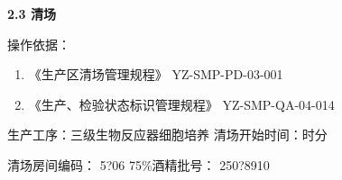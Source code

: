 \documentclass[UTF8,10pt,a4paper,fontset=fandol]{ctexart}
\newcommand{\fieldvalue}[1]{#1}
\newcommand{\handwritten}[1]{#1}
\begin{document}
\noindent\textbf{2.3 清场}

\medskip
\noindent 操作依据：

\begin{enumerate}
\item 《生产区清场管理规程》 \hfill YZ-SMP-PD-03-001
\item 《生产、检验状态标识管理规程》 \hfill YZ-SMP-QA-04-014
\end{enumerate}

\noindent 生产工序：三级生物反应器细胞培养 \hfill 清场开始时间：\underline{\hspace{1cm}}时\underline{\hspace{1cm}}分

\noindent 清场房间编码：
\fieldvalue{\handwritten{5?06}}
\hfill 75\%酒精批号：
\fieldvalue{\handwritten{250?8910}}
\end{document}
